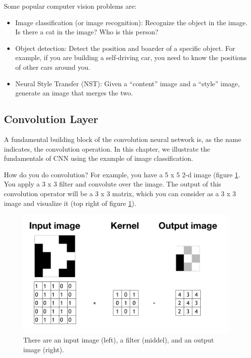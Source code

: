 \documentclass[
  12pt,
]{krantz}
\providecommand{\tightlist}{%
  \setlength{\itemsep}{0pt}\setlength{\parskip}{0pt}}
\begin{document}
Some popular computer vision problems are:

\begin{itemize}
\tightlist
\item
  Image classification (or image recognition): Recognize the object in the image. Is there a cat in the image? Who is this person?
\item
  Object detection: Detect the position and boarder of a specific object. For example, if you are building a self-driving car, you need to know the positions of other cars around you.
\item
  Neural Style Transfer (NST): Given a ``content'' image and a ``style'' image, generate an image that merges the two.
\end{itemize}

\hypertarget{convolution-layer}{%
\subsection{Convolution Layer}\label{convolution-layer}}

A fundamental building block of the convolution neural network is, as the name indicates, the convolution operation. In this chapter, we illustrate the fundamentals of CNN using the example of image classification.

How do you do convolution? For example, you have a 5 x 5 2-d image (figure \ref{fig:convolution1}. You apply a 3 x 3 filter and convolute over the image. The output of this convolution operator will be a 3 x 3 matrix, which you can consider as a 3 x 3 image and visualize it (top right of figure \ref{fig:convolution1}).

\begin{figure}

{\centering \includegraphics[width=0.8\linewidth]{images/convolution1} 

}

\caption{There are an input image (left), a filter (middel), and an output image (right).}\label{fig:convolution1}
\end{figure}
\end{document}
